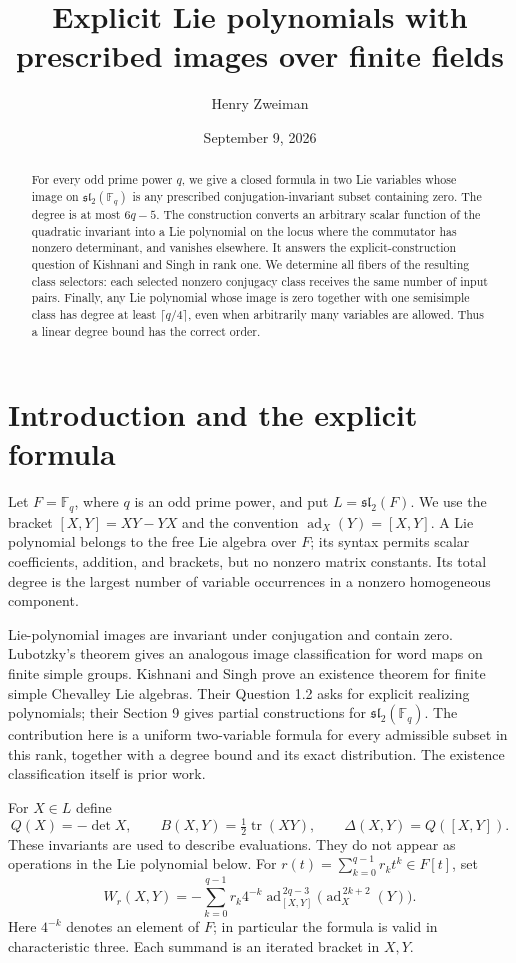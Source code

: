 \documentclass[11pt]{article}
\title{Explicit Lie polynomials with prescribed images over finite fields}
\author{Henry Zweiman}
\date{September 9, 2026}
\newcommand{\F}{\mathbb F}
\newcommand{\ad}{\operatorname{ad}}
\newcommand{\tr}{\operatorname{tr}}
\newcommand{\slie}{\mathfrak{sl}}
\begin{document}
\maketitle
\begin{abstract}
For every odd prime power $q$, we give a closed formula in two Lie variables
whose image on $\slie_2(\F_q)$ is any prescribed conjugation-invariant subset
containing zero. The degree is at most $6q-5$. The construction converts an
arbitrary scalar function of the quadratic invariant into a Lie polynomial
on the locus where the commutator has nonzero determinant, and vanishes
elsewhere. It answers the explicit-construction question of Kishnani and
Singh in rank one. We determine all fibers of the resulting class selectors:
each selected nonzero conjugacy class receives the same number of input
pairs. Finally, any Lie polynomial whose image is zero together with one
semisimple class has degree at least $\lceil q/4\rceil$, even when arbitrarily
many variables are allowed. Thus a linear degree bound has the correct order.
\end{abstract}

\section{Introduction and the explicit formula}
Let $F=\F_q$, where $q$ is an odd prime power, and put $L=\slie_2(F)$.
We use the bracket $[X,Y]=XY-YX$ and the convention
$\ad_X(Y)=[X,Y]$. A Lie polynomial belongs to the free Lie algebra over $F$;
its syntax permits scalar coefficients, addition, and brackets, but no
nonzero matrix constants. Its total degree is the largest number of variable
occurrences in a nonzero homogeneous component.

Lie-polynomial images are invariant under conjugation and contain zero.
Lubotzky's theorem \cite{Lubotzky} gives an analogous image classification
for word maps on finite simple groups. Kishnani and Singh \cite[Theorem 1.3]{KS}
prove an existence theorem for finite simple Chevalley Lie algebras.
Their Question 1.2 asks for explicit realizing polynomials; their Section 9
gives partial constructions for $\slie_2(\F_q)$.
The contribution here is a uniform two-variable formula for every admissible
subset in this rank, together with a degree bound and its exact distribution.
The existence classification itself is prior work.

For $X\in L$ define
\[
 Q(X)=-\det X,\qquad
 B(X,Y)=\tfrac12\tr(XY),\qquad
 \Delta(X,Y)=Q([X,Y]).
\]
These invariants are used to describe evaluations. They do not appear as
operations in the Lie polynomial below. For
$r(t)=\sum_{k=0}^{q-1}r_kt^k\in F[t]$, set
\begin{equation}\label{eq:word}
 W_r(X,Y)=-\sum_{k=0}^{q-1}r_k4^{-k}
       \ad_{[X,Y]}^{\,2q-3}\bigl(\ad_X^{\,2k+2}(Y)\bigr).
\end{equation}
Here $4^{-k}$ denotes an element of $F$; in particular the formula is valid
in characteristic three. Each summand is an iterated bracket in $X,Y$.
\end{document}
